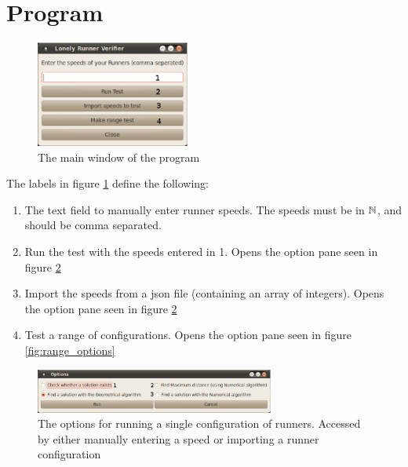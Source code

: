 \section{Program}
\label{section:program}

\begin{figure}[H]
  \centering
  \includegraphics[width=0.45\textwidth]{./images/Lonely_Runner_Verifier}
  \caption{\label{fig:main_window}The main window of the program}
\end{figure}

The labels in figure \ref{fig:main_window} define the following:
\begin{enumerate}
\item The text field to manually enter runner speeds. The speeds must be in $\mathbb{N}$, and should be comma separated.
\item Run the test with the speeds entered in 1. Opens the option pane seen in figure \ref{fig:options}
\item Import the speeds from a json file (containing an array of integers). Opens the option pane seen in figure \ref{fig:options}
\item Test a range of configurations. Opens the option pane seen in figure \ref{fig:range_options}
\end{enumerate}

\begin{figure}[H]
  \centering
  \includegraphics[width=0.70\textwidth]{./images/Options}
  \caption{\label{fig:options}The options for running a single configuration of runners. Accessed by either manually entering a speed or importing a runner configuration}
\end{figure}

